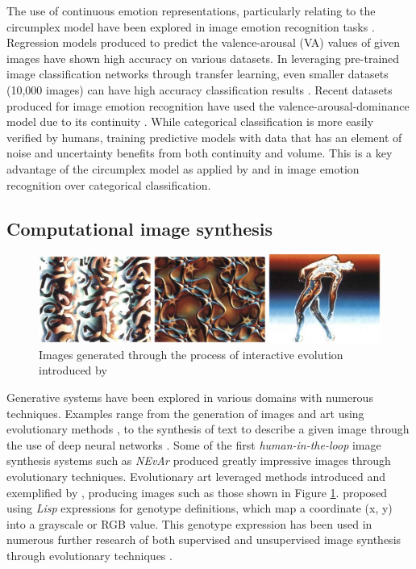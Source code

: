 \documentclass{article}
\begin{document}
The use of continuous emotion representations, particularly relating to the circumplex model have been explored in image emotion recognition tasks \citep{kim2018building, zhao2016predicting, zhao2017continuous}.
Regression models produced to predict the valence-arousal (VA) values of given images have shown high accuracy on various datasets.
In leveraging pre-trained image classification networks through transfer learning, even smaller datasets (10,000 images) can have high accuracy classification results \citep{kim2018building}.
Recent datasets produced for image emotion recognition have used the valence-arousal-dominance model due to its continuity \citep{zhao2016predicting}.
While categorical classification is more easily verified by humans, training predictive models with data that has an element of noise and uncertainty benefits from both continuity and volume.
This is a key advantage of the circumplex model as applied by \citet{kim2018building} and \citet{zhao2016predicting} in image emotion recognition over categorical classification.


\subsection{Computational image synthesis}

\begin{figure}[h!]
	\includegraphics[width=\textwidth]{images/sims-interactive-image-generation.png}
	\caption{Images generated through the process of interactive evolution introduced by \citet{sims}}
	\label{fig:sims}
\end{figure}

Generative systems have been explored in various domains with numerous techniques.
Examples range from the generation of images and art using evolutionary methods \citep{sims, nevar}, to the synthesis of text to describe a given image through the use of deep neural networks \citep{mathews2016senticap}.
Some of the first \textit{human-in-the-loop} image synthesis systems such as \textit{NEvAr} \citep{nevar} produced greatly impressive images through evolutionary techniques.
Evolutionary art leveraged methods introduced and exemplified by \citet{sims}, producing images such as those shown in Figure \ref{fig:sims}.
\citet{sims} proposed using \textit{Lisp} expressions for genotype definitions, which map a coordinate (x, y) into a grayscale or RGB value.
This genotype expression has been used in numerous further research of both supervised and unsupervised image synthesis through evolutionary techniques \citep{nevar, sims, den2011evolving, distributed-evolutionary-art, aesthetic-measures}.
\end{document}
